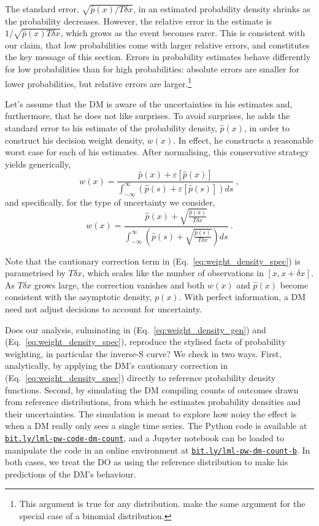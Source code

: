 \documentclass[a4paper, 12pt]{article}
\newcommand{\elabel}[1]{\label{eq:#1}}
\newcommand{\eref}[1]{(Eq.~\ref{eq:#1})}
\newcommand{\be}{\begin{equation}}
\newcommand{\ee}{\end{equation}}
\newcommand{\err}[1]{\varepsilon\left[#1\right]}
\newcommand{\phat}{\hat{p}}
\begin{document}
The standard error, $ \sqrt{\phat(x)/T \delta x}$, in an estimated probability density shrinks as the probability decreases. However, the relative error in the estimate is $1/\sqrt{\phat(x)T\delta x}$, which grows as the event becomes rarer. This is consistent with our claim, that low probabilities come with larger relative errors, and constitutes the key message of this section. Errors in probability estimates behave differently for low probabilities than for high probabilities: absolute errors are smaller for lower probabilities, but relative errors are larger.\footnote{This argument is true for any distribution. \textcite[537-8]{HertwigETAL2004} make the same argument for the special case of a binomial distribution.}

Let's assume that the DM is aware of the uncertainties in his estimates and, furthermore, that he does not like surprises. To avoid surprises, he adds the standard error to his estimate of the probability density, $\phat(x)$, in order to construct his decision weight density, $w(x)$. In effect, he constructs a reasonable worst case for each of his estimates. After normalising, this conservative strategy yields generically,
\be
w(x) = \frac{\phat(x)+\err{\phat(x)}}{\int_{-\infty}^{\infty}\left(\phat(s)+\err{\phat(s)}\right)ds}~,
\elabel{weight_density_gen}
\ee
and specifically, for the type of uncertainty we consider,
\be
w(x)= \frac{\phat(x)+\sqrt{\frac{\phat(x)}{T \delta x}}}{\int_{-\infty}^{\infty}\left(\phat(s)+\sqrt{\frac{\phat(s)}{T \delta x}}\right)ds}~.
\elabel{weight_density_spec}
\ee

Note that the cautionary correction term in \eref{weight_density_spec} is parametrised by $T\delta x$, which scales like the number of observations in $[x, x+\delta x]$. As $T\delta x$ grows large, the correction vanishes and both $w(x)$ and $\phat(x)$ become consistent with the asymptotic density, $p(x)$. With perfect information, a DM need not adjust decisions to account for uncertainty.

Does our analysis, culminating in \eref{weight_density_gen} and \eref{weight_density_spec}, reproduce the stylised facts of probability weighting, in particular the inverse-S curve? We check in two ways. First, analytically, by applying the DM's cautionary correction in \eref{weight_density_spec} directly to reference probability density functions. Second, by simulating the DM compiling counts of outcomes drawn from reference distributions, from which he estimates probability densities and their uncertainties. The simulation is meant to explore how noisy the effect is when a DM really only sees a single time series. The Python code is available at \href{https://bit.ly/lml-pw-code-dm-count}{\texttt{bit.ly/lml-pw-code-dm-count}}, and a Jupyter notebook can be loaded to manipulate the code in an online environment at \href{https://bit.ly/lml-pw-dm-count-b}{\texttt{bit.ly/lml-pw-dm-count-b}}. In both cases, we treat the DO as using the reference distribution to make his predictions of the DM's behaviour.
\end{document}
